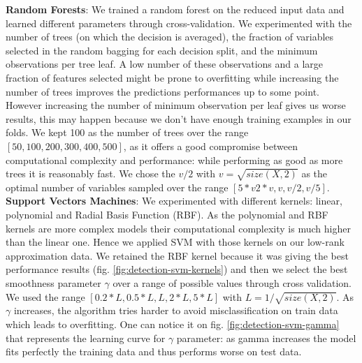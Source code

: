 \documentclass[10pt,a4paper]{article}
\begin{document}
    \textbf{Random Forests}: We trained a random forest on the reduced input data and learned different parameters through cross-validation. We experimented with the number of trees (on which the decision is averaged), the fraction of variables selected in the random bagging for each decision split, and the minimum observations per tree leaf. A low number of these observations and a large fraction of features selected might be prone to overfitting while increasing the number of trees improves the predictions performances up to some point. However increasing the number of minimum observation per leaf gives us worse results, this may happen because we don't have enough training examples in our folds. We kept 100 as the number of trees over the range $[50, 100, 200, 300, 400, 500]$, as it offers a good compromise between computational complexity and performance:  while performing as good as more trees it is reasonably fast. We chose the $v/ 2$ with $v = \sqrt{size(X,2)}$ as the optimal number of variables sampled over the range $[5*v 2*v, v, v/ 2, v/ 5]$.\\

  \textbf{Support Vectors Machines}: We experimented with different kernels: linear, polynomial and Radial Basis Function (RBF). As the polynomial and RBF kernels are more complex models their computational complexity is much higher than the linear one. Hence we applied SVM with those kernels on our low-rank approximation data. We retained the RBF kernel because it was giving the best performance results (fig. \ref{fig:detection-svm-kernels}) and then we select the best smoothness parameter $\gamma$ over a range of possible values through cross validation. We used the range $[0.2*L, 0.5*L, L, 2*L, 5*L]$ with $L = 1 / \sqrt{size(X,2)}$. As $\gamma$ increases, the algorithm tries harder to avoid misclassification on train data which leads to overfitting. One can notice it on fig. \ref{fig:detection-svm-gamma} that represents the learning curve for $\gamma$ parameter: as gamma increases the model fits perfectly the training data and thus performs worse on test data.\\
  
\end{document}
